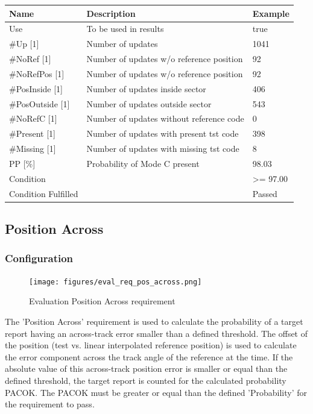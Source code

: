 \begin{center}
 \begin{table}[H]
  \begin{tabularx}{\textwidth}{ | l | X |  l | }
    \hline
    \textbf{Name} & \textbf{Description} & \textbf{Example} \\ \hline
    Use & To be used in results & true \\ \hline
    \#Up [1] & Number of updates & 1041 \\ \hline
    \#NoRef [1] & Number of updates w/o reference position & 92 \\ \hline
    \#NoRefPos [1] & Number of updates w/o reference position  & 92 \\ \hline
    \#PosInside [1] & Number of updates inside sector & 406 \\ \hline
    \#PosOutside [1] & Number of updates outside sector & 543 \\ \hline
    \#NoRefC [1] & Number of updates without reference code & 0 \\ \hline
    \#Present [1] & Number of updates with present tst code & 398 \\ \hline
    \#Missing [1] & Number of updates with missing tst code & 8 \\ \hline
    PP [\%] & Probability of Mode C present & 98.03 \\ \hline
    Condition &  & >= 97.00 \\ \hline
    Condition Fulfilled &  & Passed \\ \hline
\end{tabularx}
\end{table}
\end{center}

\subsection{Position Across}
\label{sec:eval_req_pos_across} 

\subsubsection{Configuration}

\begin{figure}[H]
    \texttt{[image: figures/eval\_req\_pos\_across.png]}
  \caption{Evaluation Position Across requirement}
\end{figure}

The 'Position Across' requirement is used to calculate the probability of a target report having an across-track error smaller than a defined threshold. The offset of the position (test vs. linear interpolated reference position) is used to calculate the error component across the track angle of the reference at the time. If the absolute value of this across-track position error is smaller or equal than the defined threshold, the target report is counted for the calculated probability PACOK. The PACOK must be greater or equal than the defined 'Probability' for the requirement to pass. \\

